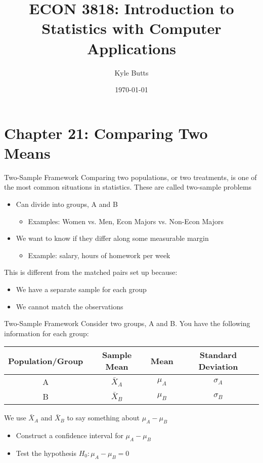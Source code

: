 \documentclass{beamer}
\title{ECON 3818: Introduction to Statistics with Computer Applications}
\date{\today}
\author{Kyle Butts}
\begin{document}
\maketitle


\section{Chapter 21: Comparing Two Means}


\begin{frame}{Two-Sample Framework}
	Comparing two populations, or two treatments, is one of the most common situations in statistics. These are called \alert{two-sample problems}
	
	\begin{itemize}
		\item Can divide into groups, A and B
		      \begin{itemize}
		      	\item Examples: Women vs. Men, Econ Majors vs. Non-Econ Majors
		      \end{itemize}
		\item We want to know if they differ along some measurable margin
		      \begin{itemize}
		      	\item Example: salary, hours of homework per week
		      \end{itemize}
	\end{itemize}
	This is different from the matched pairs set up because:
	\begin{itemize}
		\item We have a separate sample for each group
		\item We cannot match the observations
	\end{itemize}
\end{frame}

\begin{frame}{Two-Sample Framework}
	Consider two groups, A and B. You have the following information for each group:
	
	\begin{center}
		\begin{tabular}{|c|c|c|c|}
			\hline
			\textbf{Population/Group} & \textbf{Sample Mean} & \textbf{Mean} & \textbf{Standard Deviation} \\
			\hline
			A & $\bar{X}_A$ & $\mu_A$ & $\sigma_A$ \\
			\hline
			B & $\bar{X}_B$ & $\mu_B$ & $\sigma_B$ \\
			\hline
		\end{tabular}
	\end{center}
		
	We use $\bar{X}_A$ and $\bar{X}_B$ to say something about $\mu_A - \mu_B$
	\begin{itemize}
		\item Construct a confidence interval for $\mu_A-\mu_B$
		\item Test the hypothesis $H_0: \mu_A - \mu_B = 0$
	\end{itemize}
\end{frame}
\end{document}

